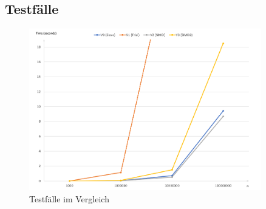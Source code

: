 \documentclass[course=erap]{aspdoc}
\begin{document}
\subsection{Testfälle}

\begin{figure}[ht]
\caption{Testfälle im Vergleich}
\includegraphics[width=0.9\textwidth]{images/algoperformanz.png}
\end{figure}
\end{document}
